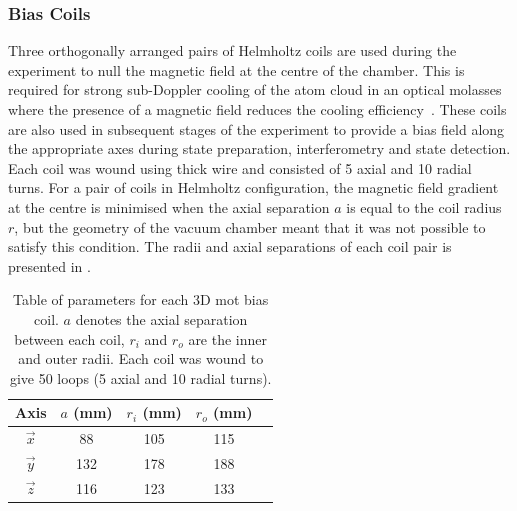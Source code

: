 \subsubsection{Bias Coils}
Three orthogonally arranged pairs of Helmholtz coils are used during the
experiment to null the magnetic field at the centre of the chamber. This is
required for strong sub-Doppler cooling of the atom cloud in an optical molasses
where the presence of a magnetic field reduces the cooling
efficiency~\cite{Walhout1992}. These coils are also used in subsequent stages of
the experiment to provide a bias field along the appropriate axes during state
preparation, interferometry and state detection. Each coil was wound using
 thick wire and consisted of 5 axial and 10 radial
turns. For a pair of coils in Helmholtz configuration, the magnetic field
gradient at the centre is minimised when the axial separation \(a\) is equal to
the coil radius \(r\), but the geometry of the vacuum chamber meant that it was
not possible to satisfy this condition. The radii and axial separations of each
coil pair is presented in .\begin{table}
	\begin{tabular}{|c|c|c|c|c|}
		\hline
		Axis        & \(a\) (mm) & \(r_i\) (mm) & \(r_o\) (mm) \\
		\hline
		\(\vec{x}\) & 88         & 105          & 115          \\
		\(\vec{y}\) & 132        & 178          & 188          \\
		\(\vec{z}\) & 116        & 123          & 133          \\
		\hline
	\end{tabular}
	\caption[Table of parameters for each 3D \ac{mot} bias coil.]{Table of
		parameters for each 3D \ac{mot }bias coil. \(a\) denotes the axial
		separation between each coil, \(r_i\) and \(r_o\) are the inner and
		outer radii. Each coil was wound to give 50 loops (5 axial and 10 radial
		turns).}
	\label{tab:bias_coils}
\end{table}
